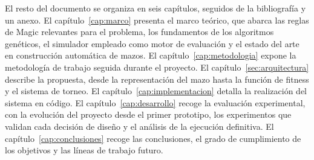 El resto del documento se organiza en seis capítulos, seguidos de la bibliografía y un anexo. El capítulo~\ref{cap:marco} presenta el marco teórico, que abarca las reglas de Magic relevantes para el problema, los fundamentos de los algoritmos genéticos, el simulador empleado como motor de evaluación y el estado del arte en construcción automática de mazos. El capítulo~\ref{cap:metodologia} expone la metodología de trabajo seguida durante el proyecto. El capítulo~\ref{sec:arquitectura} describe la propuesta, desde la representación del mazo hasta la función de fitness y el sistema de torneo. El capítulo~\ref{cap:implementacion} detalla la realización del sistema en código. El capítulo~\ref{cap:desarrollo} recoge la evaluación experimental, con la evolución del proyecto desde el primer prototipo, los experimentos que validan cada decisión de diseño y el análisis de la ejecución definitiva. El capítulo~\ref{cap:conclusiones} recoge las conclusiones, el grado de cumplimiento de los objetivos y las líneas de trabajo futuro.